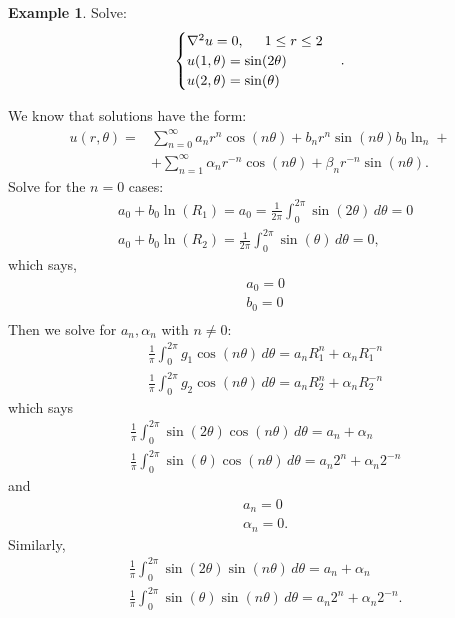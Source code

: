 \documentclass{article}
\theoremstyle{definition}
\newtheorem{exmp}{Example}[section]
\newcommand{\f}[2]{\frac{#1}{#2}}
\begin{document}
\begin{exmp}
	Solve:
	\begin{align*}
	\begin{cases}
	\laplacian u = 0, \hspace{0.5cm} 1\leq r\leq 2\\
	u(1,\theta) = \sin(2\theta)\\
	u(2,\theta) = \sin(\theta)
	\end{cases}.
	\end{align*}
	
	We know that solutions have the form:
	\begin{align*}
	u(r,\theta) =& \sum^\infty_{n=0} a_n r^n \cos(n\theta) + b_n r^{n}\sin(n\theta) b_0\ln_n +\\
	&+\sum^\infty_{n=1}\alpha_n r^{-n}\cos(n\theta) + \beta_n r^{-n}\sin(n\theta). 
	\end{align*}
	Solve for the $n=0$ cases:
	\begin{align*}
	&a_0 + b_0 \ln(R_1) = a_0 = \f{1}{2\pi}\int^{2\pi}_0 \sin(2\theta)\,d\theta = 0\\
	&a_0 + b_0 \ln(R_2) = \f{1}{2\pi}\int^{2\pi}_0 \sin(\theta)\,d\theta = 0,
	\end{align*}
	which says,
	\begin{align*}
	&a_0 = 0\\
	&b_0 = 0\\
	\end{align*}
	Then we solve for $a_n, \alpha_n$ with $n\neq 0$:
	\begin{align*}
	&\f{1}{\pi}\int^{2\pi}_0 g_1\cos(n\theta)\,d\theta = a_n R_1^n + \alpha_n R_1^{-n}\\
	&\f{1}{\pi}\int^{2\pi}_0 g_2\cos(n\theta)\,d\theta = a_n R_2^n + \alpha_n R_2^{-n}
	\end{align*}
	which says
	\begin{align*}
	&\f{1}{\pi}\int^{2\pi}_0 \sin(2\theta)\cos(n\theta)\,d\theta = a_n + \alpha_n\\
	&\f{1}{\pi}\int^{2\pi}_0 \sin(\theta)\cos(n\theta)\,d\theta = a_n 2^n + \alpha_n 2^{-n}
	\end{align*}
	and
	\begin{align*}
	&a_n = 0\\
	&\alpha_n = 0.
	\end{align*}
	Similarly, 
	\begin{align*}
	&\f{1}{\pi}\int^{2\pi}_0 \sin(2\theta)\sin(n\theta)\,d\theta = a_n + \alpha_n\\
	&\f{1}{\pi}\int^{2\pi}_0 \sin(\theta)\sin(n\theta)\,d\theta = a_n 2^n + \alpha_n 2^{-n}.

\end{align*}
\end{exmp}
\end{document}
